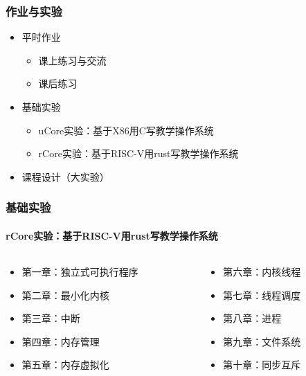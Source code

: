 \documentclass[UTF8]{ctexbeamer}
\begin{document}
    \begin{frame}
        \frametitle{作业与实验}
        \begin{itemize}
            \item 平时作业
        \begin{itemize}
    		\item 课上练习与交流
	    	\item 课后练习
        \end{itemize}

            \item 基础实验
    \begin{itemize}
		\item uCore实验：基于X86用C写教学操作系统
		\item rCore实验：基于RISC-V用rust写教学操作系统
    \end{itemize}
            \item 课程设计（大实验）
        \end{itemize}
\end{frame}

\begin{frame}
\frametitle{基础实验}
\framesubtitle{rCore实验：基于RISC-V用rust写教学操作系统}
\begin{columns}
\begin{column}{0.5\textwidth}
\begin{itemize}
		\item 第一章：独立式可执行程序
		\item 第二章：最小化内核
		\item 第三章：中断
		\item 第四章：内存管理
		\item 第五章：内存虚拟化
\end{itemize}
\end{column}
 
\begin{column}{0.5\textwidth}
    \begin{itemize}
		\item 第六章：内核线程
		\item 第七章：线程调度
		\item 第八章：进程
		\item 第九章：文件系统
		\item 第十章：同步互斥
    \end{itemize}
\end{column}

\end{columns}
\end{frame}
\end{document}
